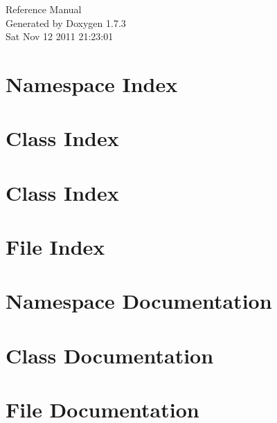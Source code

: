 \documentclass[a4paper]{book}
\begin{document}
\hypersetup{pageanchor=false}
\begin{titlepage}
\vspace*{7cm}
\begin{center}
{\Large Reference Manual}\\
\vspace*{1cm}
{\large Generated by Doxygen 1.7.3}\\
\vspace*{0.5cm}
{\small Sat Nov 12 2011 21:23:01}\\
\end{center}
\end{titlepage}
\clearemptydoublepage
{}
\tableofcontents
\clearemptydoublepage
{}
\hypersetup{pageanchor=true}
\chapter{Namespace Index}

\chapter{Class Index}

\chapter{Class Index}

\chapter{File Index}

\chapter{Namespace Documentation}

\chapter{Class Documentation}















\chapter{File Documentation}

















\printindex
\end{document}
